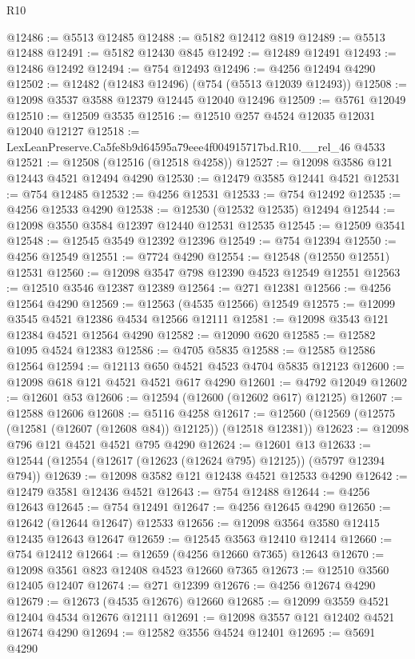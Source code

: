 \begin{lexlean}{R10}
\begin{coremodule}
@12486 := @5513 @12485
@12488 := @5182 @12412 @819
@12489 := @5513 @12488
@12491 := @5182 @12430 @845
@12492 := @12489 @12491
@12493 := @12486 @12492
@12494 := @754 @12493
@12496 := @4256 @12494 @4290
@12502 := @12482 (@12483 @12496) (@754 (@5513 @12039 @12493))
@12508 := @12098 @3537 @3588 @12379 @12445 @12040 @12496
@12509 := @5761 @12049
@12510 := @12509 @3535
@12516 := @12510 @257 @4524 @12035 @12031 @12040 @12127
@12518 := LexLeanPreserve.Ca5fe8b9d64595a79eee4f004915717bd.R10.__rel_46 @4533
@12521 := @12508 (@12516 (@12518 @4258))
@12527 := @12098 @3586 @121 @12443 @4521 @12494 @4290
@12530 := @12479 @3585 @12441 @4521
@12531 := @754 @12485
@12532 := @4256 @12531
@12533 := @754 @12492
@12535 := @4256 @12533 @4290
@12538 := @12530 (@12532 @12535) @12494
@12544 := @12098 @3550 @3584 @12397 @12440 @12531 @12535
@12545 := @12509 @3541
@12548 := @12545 @3549 @12392 @12396
@12549 := @754 @12394
@12550 := @4256 @12549
@12551 := @7724 @4290
@12554 := @12548 (@12550 @12551) @12531
@12560 := @12098 @3547 @798 @12390 @4523 @12549 @12551
@12563 := @12510 @3546 @12387 @12389
@12564 := @271 @12381
@12566 := @4256 @12564 @4290
@12569 := @12563 (@4535 @12566) @12549
@12575 := @12099 @3545 @4521 @12386 @4534 @12566 @12111
@12581 := @12098 @3543 @121 @12384 @4521 @12564 @4290
@12582 := @12090 @620
@12585 := @12582 @1095 @4524 @12383
@12586 := @4705 @5835
@12588 := @12585 @12586 @12564
@12594 := @12113 @650 @4521 @4523 @4704 @5835 @12123
@12600 := @12098 @618 @121 @4521 @4521 @617 @4290
@12601 := @4792 @12049
@12602 := @12601 @53
@12606 := @12594 (@12600 (@12602 @617) @12125)
@12607 := @12588 @12606
@12608 := @5116 @4258
@12617 := @12560 (@12569 (@12575 (@12581 (@12607 (@12608 @84)) @12125)) (@12518 @12381))
@12623 := @12098 @796 @121 @4521 @4521 @795 @4290
@12624 := @12601 @13
@12633 := @12544 (@12554 (@12617 (@12623 (@12624 @795) @12125)) (@5797 @12394 @794))
@12639 := @12098 @3582 @121 @12438 @4521 @12533 @4290
@12642 := @12479 @3581 @12436 @4521
@12643 := @754 @12488
@12644 := @4256 @12643
@12645 := @754 @12491
@12647 := @4256 @12645 @4290
@12650 := @12642 (@12644 @12647) @12533
@12656 := @12098 @3564 @3580 @12415 @12435 @12643 @12647
@12659 := @12545 @3563 @12410 @12414
@12660 := @754 @12412
@12664 := @12659 (@4256 @12660 @7365) @12643
@12670 := @12098 @3561 @823 @12408 @4523 @12660 @7365
@12673 := @12510 @3560 @12405 @12407
@12674 := @271 @12399
@12676 := @4256 @12674 @4290
@12679 := @12673 (@4535 @12676) @12660
@12685 := @12099 @3559 @4521 @12404 @4534 @12676 @12111
@12691 := @12098 @3557 @121 @12402 @4521 @12674 @4290
@12694 := @12582 @3556 @4524 @12401
@12695 := @5691 @4290

\end{coremodule}
\end{lexlean}
